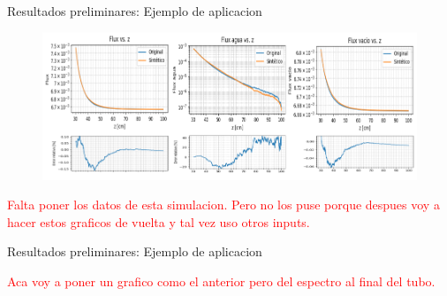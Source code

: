 \documentclass[aspectratio=169,english]{beamer}
\begin{document}
\begin{frame}{Resultados preliminares: Ejemplo de aplicacion}
    \begin{figure}
        \centering
        \includegraphics[width=0.9\linewidth]{imagens/flujos.png}
        \label{fig:flujos.png}
    \end{figure}
    \textcolor{red}{Falta poner los datos de esta simulacion. Pero no los puse porque despues voy a hacer estos graficos de vuelta y tal vez uso otros inputs.}
    

\end{frame}

\begin{frame}{Resultados preliminares: Ejemplo de aplicacion}
    
    \textcolor{red}{Aca voy a poner un grafico como el anterior pero del espectro al final del tubo.}
    

\end{frame}


    

\end{document}
